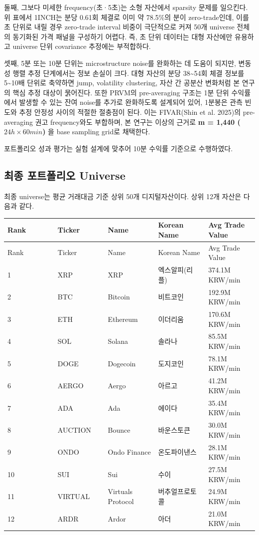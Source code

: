 \documentclass[12pt,a4paper]{article}
\begin{document}
둘째, 그보다 미세한 frequency(초·5초)는 소형 자산에서 sparsity 문제를 일으킨다. 위 표에서 1INCH는 분당 0.61회 체결로 이미 약 78.5\%의 분이 zero-trade인데, 이를 초 단위로 내릴 경우 zero-trade interval 비중이 극단적으로 커져 50개 universe 전체의 동기화된 가격 패널을 구성하기 어렵다. 즉, 초 단위 데이터는 대형 자산에만 유용하고 universe 단위 covariance 추정에는 부적합하다.

셋째, 5분 또는 10분 단위는 microstructure noise를 완화하는 데 도움이 되지만, 변동성 행렬 추정 단계에서는 정보 손실이 크다. 대형 자산의 분당 38\textasciitilde{}54회 체결 정보를 5\textasciitilde{}10배 단위로 축약하면 jump, volatility clustering, 자산 간 공분산 변화처럼 본 연구의 핵심 추정 대상이 묽어진다. 또한 PRVM의 pre-averaging 구조는 1분 단위 수익률에서 발생할 수 있는 잔여 noise를 추가로 완화하도록 설계되어 있어, 1분봉은 관측 빈도와 추정 안정성 사이의 적절한 절충점이 된다. 이는 FIVAR(Shin et al. 2025)의 pre-averaging 권고 frequency와도 부합하며, 본 연구는 이상의 근거로 \textbf{m = 1,440 ($24h \times 60min$)} 을 base sampling grid로 채택한다.

포트폴리오 성과 평가는 실험 설계에 맞추어 10분 수익률 기준으로 수행하였다.

\subsection{최종 포트폴리오 Universe}

최종 universe는 평균 거래대금 기준 상위 50개 디지털자산이다. 상위 12개 자산은 다음과 같다.

\begin{center}
\scriptsize
\begin{longtable}{@{}p{0.20\linewidth}p{0.20\linewidth}p{0.20\linewidth}p{0.20\linewidth}p{0.20\linewidth}@{}}
\toprule
Rank & Ticker & Name & Korean Name & Avg Trade Value \\
\midrule
\endfirsthead
\toprule
Rank & Ticker & Name & Korean Name & Avg Trade Value \\
\midrule
\endhead
1 & XRP & XRP & 엑스알피(리플) & 374.1M KRW/min \\
2 & BTC & Bitcoin & 비트코인 & 192.9M KRW/min \\
3 & ETH & Ethereum & 이더리움 & 170.6M KRW/min \\
4 & SOL & Solana & 솔라나 & 85.5M KRW/min \\
5 & DOGE & Dogecoin & 도지코인 & 78.1M KRW/min \\
6 & AERGO & Aergo & 아르고 & 41.2M KRW/min \\
7 & ADA & Ada & 에이다 & 35.4M KRW/min \\
8 & AUCTION & Bounce & 바운스토큰 & 30.0M KRW/min \\
9 & ONDO & Ondo Finance & 온도파이낸스 & 28.1M KRW/min \\
10 & SUI & Sui & 수이 & 27.5M KRW/min \\
11 & VIRTUAL & Virtuals Protocol & 버추얼프로토콜 & 24.9M KRW/min \\
12 & ARDR & Ardor & 아더 & 21.0M KRW/min \\
\bottomrule
\end{longtable}
\end{center}
\end{document}
